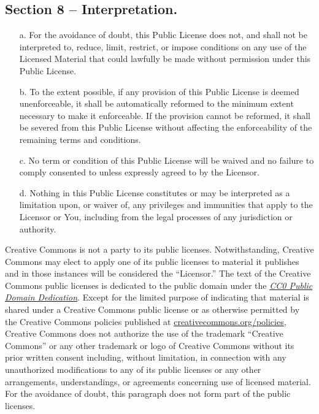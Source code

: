 \subsection*{Section 8 – Interpretation.}
\begin{itemize}
\item[a.] For the avoidance of doubt, this Public License does not, and shall not be interpreted to, reduce, limit, restrict, or impose conditions on any use of the Licensed Material that could lawfully be made without permission under this Public License.
\item[b.] To the extent possible, if any provision of this Public License is deemed unenforceable, it shall be automatically reformed to the minimum extent necessary to make it enforceable. If the provision cannot be reformed, it shall be severed from this Public License without affecting the enforceability of the remaining terms and conditions.
\item[c.] No term or condition of this Public License will be waived and no failure to comply consented to unless expressly agreed to by the Licensor.
\item[d.] Nothing in this Public License constitutes or may be interpreted as a limitation upon, or waiver of, any privileges and immunities that apply to the Licensor or You, including from the legal processes of any jurisdiction or authority.
\end{itemize}

Creative Commons is not a party to its public licenses. Notwithstanding, Creative Commons may elect to apply one of its public licenses to material it publishes and in those instances will be considered the “Licensor.” The text of the Creative Commons public licenses is dedicated to the public domain under the \href{https://creativecommons.org/publicdomain/zero/1.0/legalcode}{\textsl{CC0 Public Domain Dedication}}. Except for the limited purpose of indicating that material is shared under a Creative Commons public license or as otherwise permitted by the Creative Commons policies published at \href{https://creativecommons.org/policies}{creativecommons.org/policies}, Creative Commons does not authorize the use of the trademark “Creative Commons” or any other trademark or logo of Creative Commons without its prior written consent including, without limitation, in connection with any unauthorized modifications to any of its public licenses or any other arrangements, understandings, or agreements concerning use of licensed material. For the avoidance of doubt, this paragraph does not form part of the public licenses.

